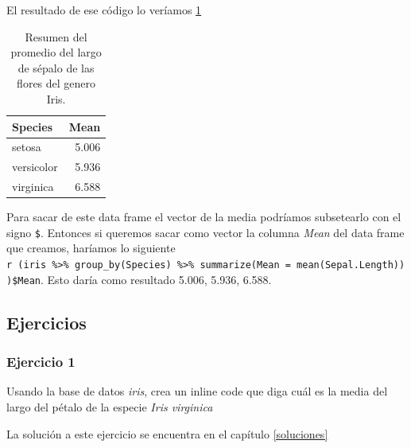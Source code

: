 \documentclass[]{book}
\newenvironment{Shaded}{\begin{snugshade}}{\end{snugshade}}
\newcommand{\DataTypeTok}[1]{\textcolor[rgb]{0.13,0.29,0.53}{#1}}
\newcommand{\KeywordTok}[1]{\textcolor[rgb]{0.13,0.29,0.53}{\textbf{#1}}}
\newcommand{\NormalTok}[1]{#1}
\newcommand{\OperatorTok}[1]{\textcolor[rgb]{0.81,0.36,0.00}{\textbf{#1}}}
\newcommand{\StringTok}[1]{\textcolor[rgb]{0.31,0.60,0.02}{#1}}
\begin{document}
\begin{Shaded}
\end{Shaded}

El resultado de ese código lo veríamos \ref{tab:SummarySepaltab}

\begin{table}

\caption{\label{tab:SummarySepaltab}Resumen del promedio del largo de sépalo de las flores del genero Iris.}
\centering
\begin{tabular}[t]{lr}
\toprule
Species & Mean\\
\midrule
setosa & 5.006\\
versicolor & 5.936\\
virginica & 6.588\\
\bottomrule
\end{tabular}
\end{table}

Para sacar de este data frame el vector de la media podríamos
subsetearlo con el signo \texttt{\$}. Entonces si queremos sacar como
vector la columna \emph{Mean} del data frame que creamos, haríamos lo
siguiente
\texttt{\textasciigrave{}r\ (iris\ \%\textgreater{}\%\ group\_by(Species)\ \%\textgreater{}\%\ summarize(Mean\ =\ mean(Sepal.Length)))\$Mean\textasciigrave{}}.
Esto daría como resultado 5.006, 5.936, 6.588.

\hypertarget{ejercicios-1}{%
\subsection{Ejercicios}\label{ejercicios-1}}

\hypertarget{ejercicio-1-1}{%
\subsubsection{Ejercicio 1}\label{ejercicio-1-1}}

Usando la base de datos \emph{iris}, crea un inline code que diga cuál
es la media del largo del pétalo de la especie \emph{Iris virginica}

La solución a este ejercicio se encuentra en el capítulo
\ref{soluciones}
\end{document}
